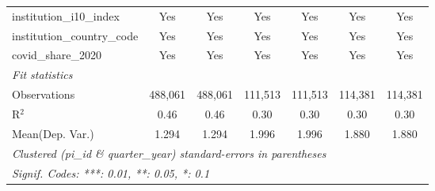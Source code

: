 \begin{tabular}{lcccccc}
   institution\_i10\_index                                     & Yes            & Yes           & Yes           & Yes           & Yes           & Yes\\  
   institution\_country\_code                                  & Yes            & Yes           & Yes           & Yes           & Yes           & Yes\\  
   covid\_share\_2020                                          & Yes            & Yes           & Yes           & Yes           & Yes           & Yes\\  
   \midrule
   \emph{Fit statistics}\\
   Observations                                                & 488,061        & 488,061       & 111,513       & 111,513       & 114,381       & 114,381\\  
   R$^2$                                                       & 0.46           & 0.46          & 0.30          & 0.30          & 0.30          & 0.30\\  
Mean(Dep. Var.) & 1.294 & 1.294 & 1.996 & 1.996 & 1.880 & 1.880 \\
   \midrule \midrule
   \multicolumn{7}{l}{\emph{Clustered (pi\_id \& quarter\_year) standard-errors in parentheses}}\\
   \multicolumn{7}{l}{\emph{Signif. Codes: ***: 0.01, **: 0.05, *: 0.1}}\\
\end{tabular}
\par\endgroup
